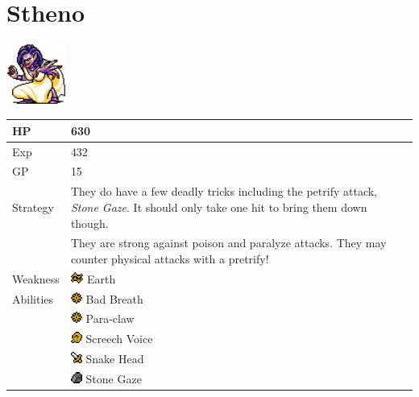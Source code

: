 \section{Stheno}
\label{monster:stheno}

\includegraphics[height=2cm,keepaspectratio]{./resources/monster/stheno}

\begin{longtable}{ l p{9cm} }
	HP
	& 630
\\ \hline
	Exp
	& 432
\\ \hline
	GP
	& 15
\\ \hline
	Strategy
	& They do have a few deadly tricks including the petrify attack, \textit{Stone Gaze}. It should only take one hit to bring them down though. \\
	& They are strong against poison and paralyze attacks. They may counter physical attacks with a pretrify!
\\ \hline
	Weakness
	& \includegraphics[height=1em,keepaspectratio]{./resources/effects/earth} Earth
\\ \hline
	Abilities
	& \includegraphics[height=1em,keepaspectratio]{./resources/effects/paralyze} Bad Breath \\
	& \includegraphics[height=1em,keepaspectratio]{./resources/effects/paralyze} Para-claw \\
	& \includegraphics[height=1em,keepaspectratio]{./resources/effects/confusion} Screech Voice \\
	& \includegraphics[height=1em,keepaspectratio]{./resources/effects/damage} Snake Head \\
	& \includegraphics[height=1em,keepaspectratio]{./resources/effects/petrify} Stone Gaze
\end{longtable}
